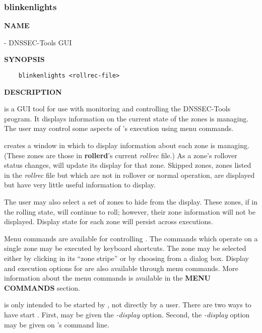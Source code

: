\clearpage

\subsubsection{\bf blinkenlights}

{\bf NAME}

 - DNSSEC-Tools  GUI

{\bf SYNOPSIS}

\begin{verbatim}
    blinkenlights <rollrec-file>
\end{verbatim}

{\bf DESCRIPTION}

 is a GUI tool for use with monitoring and controlling the
DNSSEC-Tools  program.  It displays information on the current
state of the zones  is managing.  The user may control some
aspects of 's execution using  menu commands.

 creates a window in which to display information about
each zone  is managing.  (These zones are those in {\bf
rollerd}'s current {\it rollrec} file.) As a zone's rollover status changes,
 will update its display for that zone.  Skipped zones,
zones listed in the {\it rollrec} file but which are not in rollover or normal
operation, are displayed but have very little useful information to display.

The user may also select a set of zones to hide from the display.  These
zones, if in the rolling state, will continue to roll; however, their zone
information will not be displayed.  Display state for each zone will persist
across  executions.

Menu commands are available for controlling .  The commands which
operate on a single zone may be executed by keyboard shortcuts.  The zone may
be selected either by clicking in its ``zone stripe'' or by choosing from a
dialog box.  Display and execution options for  are also
available through menu commands.  More information about the menu commands is
available in the {\bf MENU COMMANDS} section.

 is only intended to be started by , not
directly by a user.  There are two ways to have  start
.  First,  may be given the {\it -display}
option.  Second, the {\it -display} option may be given on 's
command line.

